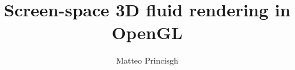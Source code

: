 \documentclass{article}
\title{\textbf{Screen-space 3D fluid rendering in OpenGL}}
\begin{document}
\author{Matteo Princisgh}
\date{}
\maketitle








\clearpage


\end{document}

